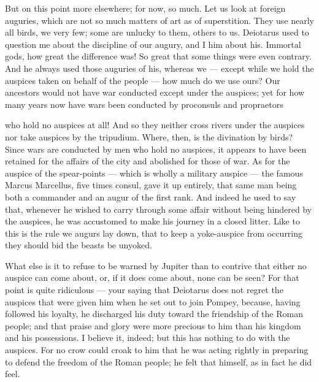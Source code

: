  But on this point more elsewhere; for now, so much. Let us look at foreign auguries, which are not so much matters of art as of superstition. They use nearly all birds, we very few; some are unlucky to them, others to us. Deiotarus used to question me about the discipline of our augury, and I him about his. Immortal gods, how great the difference was! So great that some things were even contrary. And he always used those auguries of his, whereas we — except while we hold the auspices taken on behalf of the people — how much do we use ours? Our ancestors would not have war conducted except under the auspices; yet for how many years now have wars been conducted by proconsuls and propraetors

 who hold no auspices at all! And so they neither cross rivers under the auspices nor take auspices by the tripudium. Where, then, is the divination by birds? Since wars are conducted by men who hold no auspices, it appears to have been retained for the affairs of the city and abolished for those of war. As for the auspice of the spear-points — which is wholly a military auspice — the famous Marcus Marcellus, five times consul, gave it up entirely, that same man being both a commander and an augur of the first rank. And indeed he used to say that, whenever he wished to carry through some affair without being hindered by the auspices, he was accustomed to make his journey in a closed litter. Like to this is the rule we augurs lay down, that to keep a yoke-auspice from occurring they should bid the beasts be unyoked.

 What else is it to refuse to be warned by Jupiter than to contrive that either no auspice can come about, or, if it does come about, none can be seen? For that point is quite ridiculous — your saying that Deiotarus does not regret the auspices that were given him when he set out to join Pompey, because, having followed his loyalty, he discharged his duty toward the friendship of the Roman people; and that praise and glory were more precious to him than his kingdom and his possessions. I believe it, indeed; but this has nothing to do with the auspices. For no crow could croak to him that he was acting rightly in preparing to defend the freedom of the Roman people; he felt that himself, as in fact he did feel.

